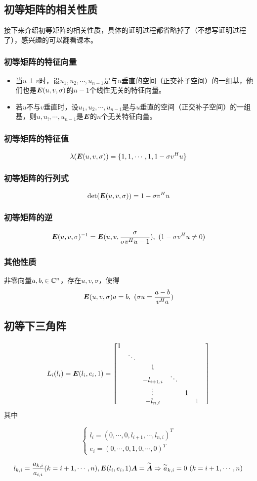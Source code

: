\documentclass[12pt, a4paper, oneside, UTF8]{ctexbook}
\begin{document}
\subsection{初等矩阵的相关性质}
接下来介绍初等矩阵的相关性质，具体的证明过程都省略掉了（不想写证明过程了），感兴趣的可以翻看课本。
\subsubsection{初等矩阵的特征向量}
\begin{itemize}
    \item 当$u\perp v$时，设$u_1,u_2,\cdots,u_{n-1}$是与$u$垂直的空间（正交补子空间）的一组基，他们也是$\boldsymbol{E}(u,v,\sigma)$的$n-1$个线性无关的特征向量。
    \item 若$u$不与$v$垂直时，设$u_1,u_2,\cdots,u_{n-1}$是与$u$垂直的空间（正交补子空间）的一组基，则$u, u_!,\cdots,u_{n-1}$是$\boldsymbol{E}$的$n$个无关特征向量。
\end{itemize}

\subsubsection{初等矩阵的特征值}
\[\lambda(\boldsymbol{E}(u,v,\sigma))=\{1,1,\cdots,1,1-\sigma v^Hu\}\]
\subsubsection{初等矩阵的行列式}
\[\det(\boldsymbol{E}(u,v,\sigma))=1-\sigma v^Hu\]
\subsubsection{初等矩阵的逆}
\[\boldsymbol{E}(u,v,\sigma)^{-1}=\boldsymbol{E}(u,v,\frac{\sigma}{\sigma v^Hu-1}),\ (1-\sigma v^Hu\neq 0)\]
\subsubsection{其他性质}
非零向量$a,b,\in\mathbb{C}^n$，存在$u,v,\sigma$，使得\[\boldsymbol{E}(u,v,\sigma)a=b,\ (\sigma u=\frac{a-b}{v^Ha})\]
\subsection{初等下三角阵}
\begin{defn}{}{}
    \[L_i(l_i)=\boldsymbol{E}(l_i,e_i,1)=\begin{bmatrix}
        1&&&&&&\\
        &\ddots&&&&\\
        &&1&&&&\\
        &&-l_{i+1,i}&\ddots&&\\
        &&\vdots&&1&\\
        &&-l_{n,i}&&&1
    \end{bmatrix}\]
其中

\[\begin{cases}
    l_i=(0,\cdots,0,l_{i+1},\cdots,l_{n,i})^T\\
    e_i=(0,\cdots,0,1,0,\cdots,0)^T
\end{cases}\]

\[l_{k,i}=\frac{a_{k,i}}{a_{i,i}}(k=i+1,\cdots,n), \boldsymbol{E}(l_i,e_i,1)\boldsymbol{A}=\overset{\sim}{\boldsymbol{A}}\Rightarrow \overset{\sim}{a}_{k,i}=0\ (k=i+1,\cdots,n)\]
\end{defn}
\end{document}
